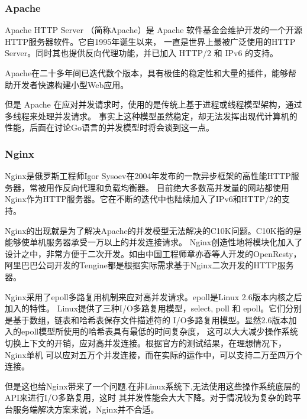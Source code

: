 \documentclass[twoside]{CUGThesis}
\begin{document}
	\subsubsection{Apache}
	Apache HTTP Server （简称Apache）是 Apache 软件基金会维护开发的一个开源HTTP服务器软件。它自1995年诞生以来，
	一直是世界上最被广泛使用的HTTP Server。同时其也提供反向代理功能，并已加入 HTTP/2 和 IPv6 的支持。\par 
	Apache在二十多年间已迭代数个版本，具有极佳的稳定性和大量的插件，能够帮助开发者快速构建小型Web应用。\par
	但是 Apache 在应对并发请求时，使用的是传统上基于进程或线程模型架构，通过多线程来处理并发请求。
	事实上这种模型虽然稳定，却无法发挥出现代计算机的性能，后面在讨论Go语言的并发模型时将会谈到这一点。\par
	\subsubsection{Nginx}
	Nginx是俄罗斯工程师Igor Sysoev在2004年发布的一款异步框架的高性能HTTP服务器，常被用作反向代理和负载均衡器。
	目前绝大多数高并发量的网站都使用Nginx作为HTTP服务器。它在不断的迭代中也陆续加入了IPv6和HTTP/2的支持。\par
	Nginx的出现就是为了解决Apache的并发模型无法解决的C10K问题。C10K指的是能够使单机服务器承受一万以上的并发连接请求。
	Nginx创造性地将模块化加入了设计之中，非常方便于二次开发。如由中国工程师章亦春等人开发的OpenResty，
	阿里巴巴公司开发的Tengine都是根据实际需求基于Nginx二次开发的HTTP服务器。\par
	Nginx采用了epoll多路复用机制来应对高并发请求。epoll是Linux 2.6版本内核之后加入的特性。
	Linux提供了三种I/O多路复用模型，select, poll 和 epoll。它们分别是基于数组，链表和哈希表保存文件描述符的
	I/O多路复用模型。显然2.6版本加入的epoll模型所使用的哈希表具有最低的时间复杂度，
	这可以大大减少操作系统切换上下文的开销，应对高并发连接。根据官方的测试结果，在理想情况下，Nginx单机
	可以应对五万个并发连接，而在实际的运作中，可以支持二万至四万个连接。\par 
	但是这也给Nginx带来了一个问题.在非Linux系统下,无法使用这些操作系统底层的API来进行I/O多路复用，这时
	其并发性能会大大下降。对于情况较为复杂的跨平台服务端解决方案来说，Nginx并不合适。\par
\end{document}
